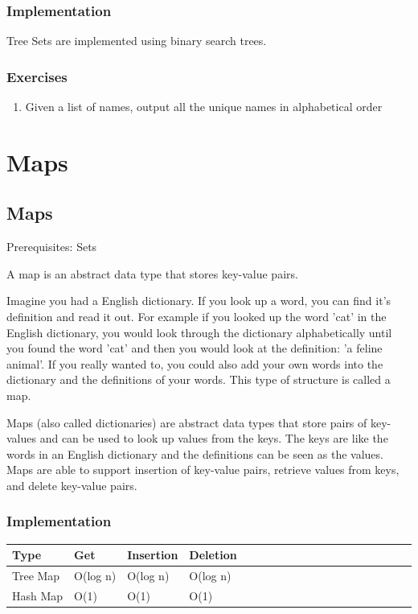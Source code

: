 \documentclass[11pt,oneside]{book}
\begin{document}
\subsection{Implementation}

Tree Sets are implemented using binary search trees.

\subsection{Exercises}

\begin{enumerate}
\item Given a list of names, output all the unique names in alphabetical order
\end{enumerate}

    \chapter{ Maps }
        \section{ Maps }
        

Prerequisites: Sets

A map is an abstract data type that stores key-value pairs.

Imagine you had a English dictionary. If you look up a word, you can find it's definition and read it out. For example if you looked up the word 'cat' in the English dictionary, you would look through the dictionary alphabetically until you found the word 'cat' and then you would look at the definition: 'a feline animal'. If you really wanted to, you could also add your own words into the dictionary and the definitions of your words. This type of structure is called a map.

Maps (also called dictionaries) are abstract data types that store pairs of key-values and can be used to look up values from the keys. The keys are like the words in an English dictionary and the definitions can be seen as the values. Maps are able to support insertion of key-value pairs, retrieve values from keys, and delete key-value pairs.

\subsection{Implementation}

\vspace{10pt} \begin{tabulary}{0.4\linewidth}{|l|l|l|l|l|l|l|l|l|l|l|l|l|l|l|l|l|l|l}\hline


  Type &
  Get &
  Insertion &
  Deletion\\
\hline


  Tree Map &
  O(log n) &
  O(log n) &
  O(log n)\\

  Hash Map &
  O(1) &
  O(1) &
  O(1)\\

\hline\end{tabulary}
\end{document}
